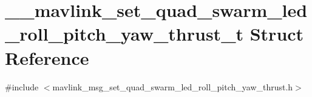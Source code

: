 \hypertarget{struct____mavlink__set__quad__swarm__led__roll__pitch__yaw__thrust__t}{\section{\-\_\-\-\_\-mavlink\-\_\-set\-\_\-quad\-\_\-swarm\-\_\-led\-\_\-roll\-\_\-pitch\-\_\-yaw\-\_\-thrust\-\_\-t Struct Reference}
\label{struct____mavlink__set__quad__swarm__led__roll__pitch__yaw__thrust__t}
}


{\ttfamily \#include $<$mavlink\-\_\-msg\-\_\-set\-\_\-quad\-\_\-swarm\-\_\-led\-\_\-roll\-\_\-pitch\-\_\-yaw\-\_\-thrust.\-h$>$}

